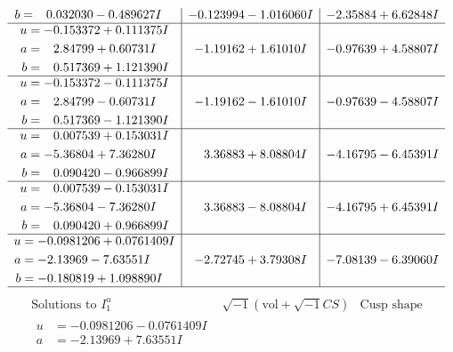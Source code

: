 \documentclass[1p]{elsarticle_modified}
\theoremstyle{definition}
\newcommand{\I}{\sqrt{-1}}
\begin{document}
$$\begin{array}{c|c|c}
\begin{aligned}
b &= \phantom{-}0.032030 - 0.489627 I\end{aligned}
 & -0.123994 - 1.016060 I & -2.35884 + 6.62848 I \\ \hline\begin{aligned}
u &= -0.153372 + 0.111375 I \\
a &= \phantom{-}2.84799 + 0.60731 I \\
b &= \phantom{-}0.517369 + 1.121390 I\end{aligned}
 & -1.19162 + 1.61010 I & -0.97639 + 4.58807 I \\ \hline\begin{aligned}
u &= -0.153372 - 0.111375 I \\
a &= \phantom{-}2.84799 - 0.60731 I \\
b &= \phantom{-}0.517369 - 1.121390 I\end{aligned}
 & -1.19162 - 1.61010 I & -0.97639 - 4.58807 I \\ \hline\begin{aligned}
u &= \phantom{-}0.007539 + 0.153031 I \\
a &= -5.36804 + 7.36280 I \\
b &= \phantom{-}0.090420 - 0.966899 I\end{aligned}
 & \phantom{-}3.36883 + 8.08804 I & -4.16795 - 6.45391 I \\ \hline\begin{aligned}
u &= \phantom{-}0.007539 - 0.153031 I \\
a &= -5.36804 - 7.36280 I \\
b &= \phantom{-}0.090420 + 0.966899 I\end{aligned}
 & \phantom{-}3.36883 - 8.08804 I & -4.16795 + 6.45391 I \\ \hline\begin{aligned}
u &= -0.0981206 + 0.0761409 I \\
a &= -2.13969 - 7.63551 I \\
b &= -0.180819 + 1.098890 I\end{aligned}
 & -2.72745 + 3.79308 I & -7.08139 - 6.39060 I\\
 \hline 
 \end{array}$$\newpage$$\begin{array}{c|c|c}  
\text{Solutions to }I^u_{1}& \I (\text{vol} + \sqrt{-1}CS) & \text{Cusp shape}\\
 \hline 
\begin{aligned}
u &= -0.0981206 - 0.0761409 I \\
a &= -2.13969 + 7.63551 I \\

\end{aligned}
\end{array}$$
\end{document}
